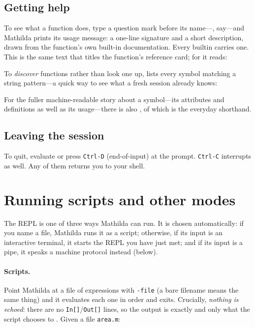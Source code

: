 \subsection{Getting help}
\label{sec:help}

To see what a function does, type a question mark before its name---,
say---and Mathilda prints its usage message: a one-line signature and a short
description, drawn from the function's own built-in documentation. Every builtin
carries one. This is the same text that titles the function's reference card; for
 it reads:


To \emph{discover} functions rather than look one up,  lists every symbol
matching a string pattern---a quick way to see what a fresh session already knows:

\begin{codepairs}
\end{codepairs}

\noindent
For the fuller machine-readable story about a symbol---its attributes and
definitions as well as its usage---there is also , of which
 is the everyday shorthand.

\subsection{Leaving the session}
\label{sec:leaving}

To quit, evaluate  or press \texttt{Ctrl-D} (end-of-input) at the
prompt. \texttt{Ctrl-C} interrupts as well. Any of them returns you to your shell.

\section{Running scripts and other modes}
\label{sec:scripts}

The REPL is one of three ways Mathilda can run. It is chosen automatically: if you
name a file, Mathilda runs it as a script; otherwise, if its input is an interactive
terminal, it starts the REPL you have just met; and if its input is a pipe, it speaks
a machine protocol instead (below).

\paragraph{Scripts.} Point Mathilda at a file of expressions with \texttt{-file} (a
bare filename means the same thing) and it evaluates each one in order and exits.
Crucially, \emph{nothing is echoed}: there are no \texttt{In[]}/\texttt{Out[]} lines,
so the output is exactly and only what the script chooses to . Given a file
\texttt{area.m}:

